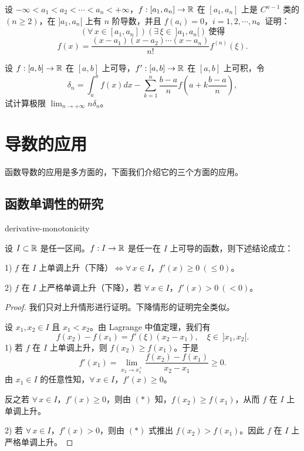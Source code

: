 \begin{exercise}
	\item 设 \(-\infty<a_1<a_2<\cdots<a_n<+\infty\)，\(f:[a_1,a_n]\to\mathbb{R}\) 在 \([a_1,a_n]\) 上是 \(C^{n-1}\) 类的 \((n\ge2)\)，在 \(]a_1,a_n[\) 上有 \(n\) 阶导数，并且 \(f(a_i)=0\)，\(i=1,2,\cdots,n\)。证明：
	\[
	(\forall\,x\in[a_1,a_n])(\exists\,\xi\in\ ]a_1,a_n[)\ \text{使得}
	\]
	\[
	f(x)=\frac{(x-a_1)(x-a_2)\cdots(x-a_n)}{n!}f^{(n)}(\xi).
	\]
\end{exercise}

\begin{exercise}
	\item 设 \(f:[a,b]\to\mathbb{R}\) 在 \([a,b]\) 上可导，\(f':[a,b]\to\mathbb{R}\) 在 \([a,b]\) 上可积，令
	\[
	\delta_n=\int_a^b f(x)dx-\sum_{k=1}^n\frac{b-a}{n}f\left(a+k\frac{b-a}{n}\right),
	\]
	试计算极限 \(\displaystyle\lim_{n\to+\infty}n\delta_n\)。
\end{exercise}

\section{导数的应用}

函数导数的应用是多方面的，下面我们介绍它的三个方面的应用。

\subsection{函数单调性的研究}

\begin{mythm}{}{derivative-monotonicity}

	设 \(I\subset\mathbb{R}\) 是任一区间。\(f:I\to\mathbb{R}\) 是任一在 \(I\) 上可导的函数，则下述结论成立：

	1) \(f\) 在 \(I\) 上单调上升（下降）\(\Longleftrightarrow\forall\,x\in I\)，\(f'(x)\ge0\ (\le0)\)。

	2) \(f\) 在 \(I\) 上严格单调上升（下降），若 \(\forall\,x\in I\)，\(f'(x)>0\ (<0)\)。

\end{mythm}

\begin{proof}

	我们只对上升情形进行证明。下降情形的证明完全类似。

	设 \(x_1,x_2\in I\) 且 \(x_1<x_2\)。由 Lagrange 中值定理，我们有
	\[
	f(x_2)-f(x_1)=f'(\xi)(x_2-x_1),\quad\xi\in\ ]x_1,x_2[. \tag{*}
	\]
	1) 若 \(f\) 在 \(I\) 上单调上升，则 \(f(x_2)\ge f(x_1)\)。于是
	\[
	f'(x_1)=\lim_{x_2\to x_1^+}\frac{f(x_2)-f(x_1)}{x_2-x_1}\ge0.
	\]
	由 \(x_1\in I\) 的任意性知，\(\forall\,x\in I\)，\(f'(x)\ge0\)。

	反之若 \(\forall\,x\in I\)，\(f'(x)\ge0\)，则由 \((*)\) 知，\(f(x_2)\ge f(x_1)\)，从而 \(f\) 在 \(I\) 上单调上升。

	2) 若 \(\forall\,x\in I\)，\(f'(x)>0\)，则由 \((*)\) 式推出 \(f(x_2)>f(x_1)\)。因此 \(f\) 在 \(I\) 上严格单调上升。

\end{proof}

